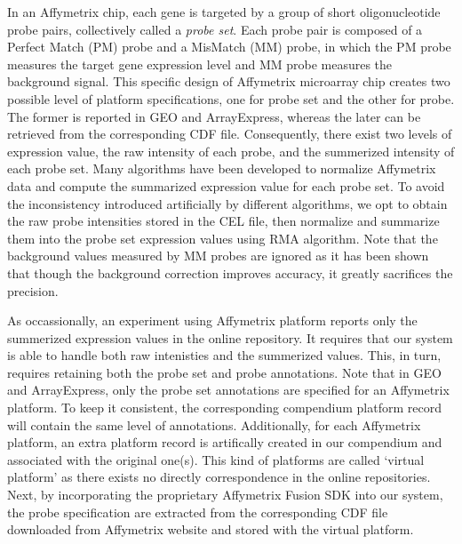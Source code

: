 In an Affymetrix chip, each gene is targeted by a group of short
oligonucleotide probe pairs, collectively called a \textit{probe set}.
%
Each probe pair is composed of a Perfect Match (PM) probe and a MisMatch
(MM) probe, in which the PM probe measures the target gene expression
level and MM probe measures the background signal.
%
This specific design of Affymetrix microarray chip creates two possible level
of platform specifications, one for probe set and the other for probe.
%
The former is reported in GEO and ArrayExpress, whereas the later can be
retrieved from the corresponding CDF file.
%
Consequently, there exist two levels of expression value, the raw intensity of
each probe, and the summerized intensity of each probe set.
%
Many algorithms \cite{Irizarry2003, Li2001, Hubbell2002} have been developed to
normalize Affymetrix data and compute the summarized expression value for each
probe set.
%
To avoid the inconsistency introduced artificially by different algorithms, we
opt to obtain the raw probe intensities stored in the CEL file, then normalize
and summarize them into the probe set expression values using RMA algorithm.
%
Note that the background values measured by MM probes are ignored as it has
been shown that though the background correction improves accuracy, it greatly
sacrifices the precision\cite{Irizarry2006}.


As occassionally, an experiment using Affymetrix platform reports only the
summerized expression values in the online repository.
%
It requires that our system is able to handle both raw intenisties and the
summerized values.  This, in turn, requires retaining both the probe set and
probe annotations.
%
Note that in GEO and ArrayExpress, only the probe set annotations are specified
for an Affymetrix platform.
%
To keep it consistent, the corresponding compendium platform record will
contain the same level of annotations.
%
Additionally, for each Affymetrix platform, an extra platform record is
artifically created in our compendium and associated with the original one(s).
%
This kind of platforms are called `virtual platform' as there exists no
directly correspondence in the online repositories.
%
Next, by incorporating the proprietary Affymetrix Fusion SDK into our system,
the probe specification are extracted from the corresponding CDF file
downloaded from Affymetrix website and stored with the virtual platform.
%


